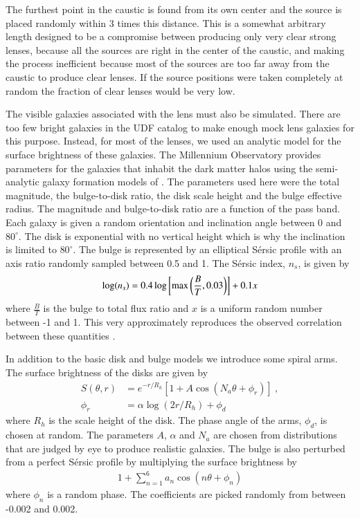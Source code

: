 \documentclass{aa}
\newcommand{\degree}{^{\circ}}
\begin{document}
The furthest point in the caustic is found from its own center and the source is placed randomly within 3 times this distance.  This is a somewhat arbitrary length designed to be a compromise between producing only very clear strong lenses, because all the sources are right in the center of the caustic, and making the process inefficient because most of the sources are too far away from the caustic to produce clear lenses.  If the source positions were taken completely at random the fraction of clear lenses would be very low.

The visible galaxies associated with the lens must also be simulated. There  are too few bright galaxies in the UDF catalog  to make enough mock lens galaxies for this purpose.  Instead, for most of the lenses, we used an analytic model for the surface brightness of these galaxies.  The Millennium Observatory provides parameters for the galaxies that inhabit the dark matter halos using the semi-analytic galaxy formation models of \citet{2011MNRAS.413..101G}.  The parameters used here were the total magnitude, the bulge-to-disk ratio, the disk scale height and the bulge effective radius.  The magnitude and bulge-to-disk ratio are a function of the pass band.  Each galaxy is given a random orientation and inclination angle between 0 and $80\degree$.  The disk is exponential with no vertical height which is why the inclination is limited to $80\degree$.  The bulge is represented by an elliptical S\'{e}rsic profile with an axis ratio randomly sampled between 0.5 and 1.  The S\'{e}rsic index, $n_s$, is given by 
\begin{align}
\log( n_s )= 0.4 \log\left[ {\rm max}\left(\frac{B}{T},0.03\right)\right] + 0.1 x 
\end{align}
where $\frac{B}{T}$ is the bulge to total flux ratio and $x$ is a uniform random number between -1 and 1.  This very approximately reproduces the observed correlation between these quantities \citep{2001AJ...121..820G}. 

In addition to the basic disk and bulge models we introduce some spiral arms.  The surface brightness of 
the disks are given by
\begin{align}
S(\theta,r) &= e^{-r/R_h} \left[ 1 + A \cos(N_a\theta + \phi_r ) \right]~, \\
\phi_r &= \alpha\log(2 r/ R_h) + \phi_d \nonumber
\end{align}
where $R_h$ is the scale height of the disk.  The phase angle of the arms, $\phi_d$, is chosen at random.  The parameters $A$, $\alpha$ and $N_a$ are chosen from distributions that are judged by eye to produce realistic 
galaxies.
The bulge is also perturbed from a perfect S\'{e}rsic profile by multiplying the surface brightness by
\begin{align}
1+\sum_{n=1}^6 a_n \cos\left( n \theta  + \phi_n \right)
\end{align}
where $\phi_n$ is a random phase.  The coefficients are picked randomly from between -0.002 and 0.002.   
\end{document}
